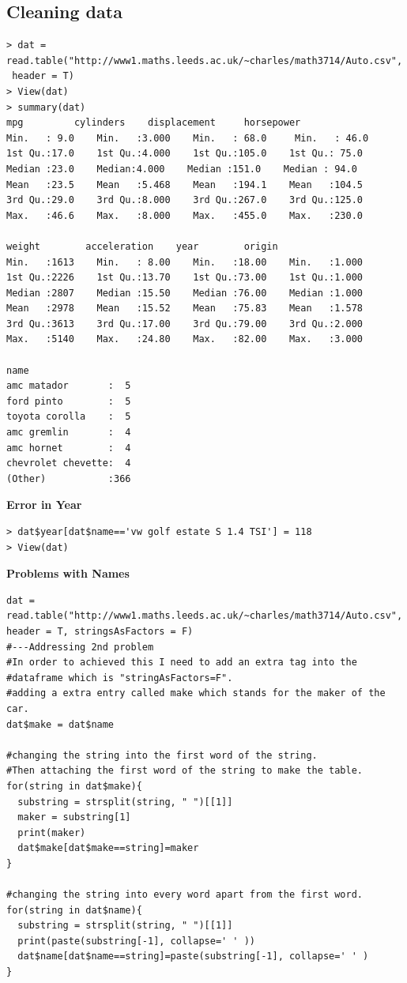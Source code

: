 \documentclass[11pt]{article} %
\begin{document}
\subsection{Cleaning data}
\begin{lstlisting}
> dat = read.table("http://www1.maths.leeds.ac.uk/~charles/math3714/Auto.csv",
 header = T)
> View(dat)
> summary(dat)
mpg         cylinders    displacement     horsepower
Min.   : 9.0    Min.   :3.000    Min.   : 68.0     Min.   : 46.0
1st Qu.:17.0    1st Qu.:4.000    1st Qu.:105.0    1st Qu.: 75.0
Median :23.0    Median:4.000    Median :151.0    Median : 94.0
Mean   :23.5    Mean   :5.468    Mean   :194.1    Mean   :104.5
3rd Qu.:29.0    3rd Qu.:8.000    3rd Qu.:267.0    3rd Qu.:125.0
Max.   :46.6    Max.   :8.000    Max.   :455.0    Max.   :230.0

weight        acceleration    year        origin
Min.   :1613    Min.   : 8.00    Min.   :18.00    Min.   :1.000
1st Qu.:2226    1st Qu.:13.70    1st Qu.:73.00    1st Qu.:1.000
Median :2807    Median :15.50    Median :76.00    Median :1.000
Mean   :2978    Mean   :15.52    Mean   :75.83    Mean   :1.578
3rd Qu.:3613    3rd Qu.:17.00    3rd Qu.:79.00    3rd Qu.:2.000
Max.   :5140    Max.   :24.80    Max.   :82.00    Max.   :3.000

name
amc matador       :  5
ford pinto        :  5
toyota corolla    :  5
amc gremlin       :  4
amc hornet        :  4
chevrolet chevette:  4
(Other)           :366
\end{lstlisting}
\textbf{Error in Year}
\begin{lstlisting}
> dat$year[dat$name=='vw golf estate S 1.4 TSI'] = 118
> View(dat)
\end{lstlisting}
\textbf{Problems with Names}
\begin{lstlisting}
dat = read.table("http://www1.maths.leeds.ac.uk/~charles/math3714/Auto.csv", header = T, stringsAsFactors = F)
#---Addressing 2nd problem
#In order to achieved this I need to add an extra tag into the 
#dataframe which is "stringAsFactors=F".
#adding a extra entry called make which stands for the maker of the car.
dat$make = dat$name

#changing the string into the first word of the string.
#Then attaching the first word of the string to make the table.
for(string in dat$make){
  substring = strsplit(string, " ")[[1]]
  maker = substring[1]
  print(maker)
  dat$make[dat$make==string]=maker
}

#changing the string into every word apart from the first word.
for(string in dat$name){
  substring = strsplit(string, " ")[[1]]
  print(paste(substring[-1], collapse=' ' ))
  dat$name[dat$name==string]=paste(substring[-1], collapse=' ' )
}
\end{lstlisting}
\end{document}
